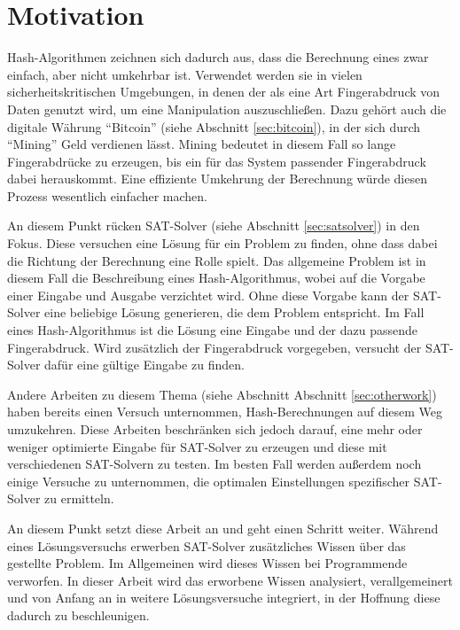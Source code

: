 \section{Motivation}

Hash-Algorithmen zeichnen sich dadurch aus, dass die Berechnung eines  zwar einfach, aber nicht umkehrbar ist.
Verwendet werden sie in vielen sicherheitskritischen Umgebungen, in denen der  als eine Art Fingerabdruck
von Daten genutzt wird, um eine Manipulation auszuschließen. Dazu gehört auch die digitale Währung "`Bitcoin"' (siehe Abschnitt
\ref{sec:bitcoin}), in der sich durch "`Mining"' Geld verdienen lässt. Mining bedeutet in diesem Fall so lange Fingerabdrücke
zu erzeugen, bis ein für das System passender Fingerabdruck dabei herauskommt. Eine effiziente Umkehrung der Berechnung würde
diesen Prozess wesentlich einfacher machen.

An diesem Punkt rücken SAT-Solver (siehe Abschnitt \ref{sec:satsolver}) in den Fokus. Diese versuchen eine Lösung für ein
Problem zu finden, ohne dass dabei die Richtung der Berechnung eine Rolle spielt. Das allgemeine Problem ist in diesem Fall
die Beschreibung eines Hash-Algorithmus, wobei auf die Vorgabe einer Eingabe und Ausgabe verzichtet wird. Ohne diese Vorgabe
kann der SAT-Solver eine beliebige Lösung generieren, die dem Problem entspricht. Im Fall eines Hash-Algorithmus ist die Lösung
eine Eingabe und der dazu passende Fingerabdruck. Wird zusätzlich der Fingerabdruck vorgegeben, versucht der SAT-Solver dafür
eine gültige Eingabe zu finden.

Andere Arbeiten zu diesem Thema (siehe Abschnitt Abschnitt \ref{sec:otherwork}) haben bereits einen Versuch unternommen,
Hash-Berechnungen auf diesem Weg umzukehren. Diese Arbeiten beschränken sich jedoch darauf, eine mehr oder weniger optimierte
Eingabe für SAT-Solver zu erzeugen und diese mit verschiedenen SAT-Solvern zu testen. Im besten Fall werden außerdem noch
einige Versuche zu unternommen, die optimalen Einstellungen spezifischer SAT-Solver zu ermitteln.

An diesem Punkt setzt diese Arbeit an und geht einen Schritt weiter. Während eines Lösungsversuchs erwerben SAT-Solver zusätzliches
Wissen über das gestellte Problem. Im Allgemeinen wird dieses Wissen bei Programmende verworfen. In dieser Arbeit wird das erworbene Wissen
analysiert, verallgemeinert und von Anfang an in weitere Lösungsversuche integriert, in der Hoffnung diese dadurch zu beschleunigen.